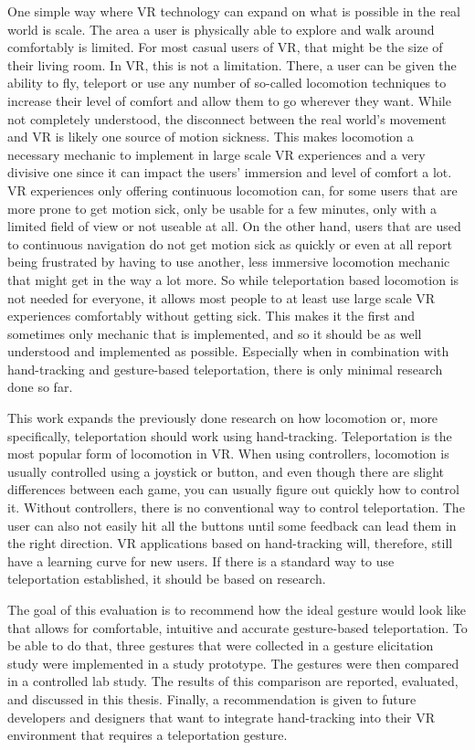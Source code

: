 One simple way where VR technology can expand on what is possible in the real world is scale. The area a user is physically able to explore and walk around comfortably is limited. For most casual users of VR, that might be the size of their living room. In VR, this is not a limitation. There, a user can be given the ability to fly, teleport or use any number of so-called locomotion techniques to increase their level of comfort and allow them to go wherever they want. While not completely understood, the disconnect between the real world's movement and VR is likely one source of motion sickness. This makes locomotion a necessary mechanic to implement in large scale VR experiences and a very divisive one since it can impact the users' immersion and level of comfort a lot. VR experiences only offering continuous locomotion can, for some users that are more prone to get motion sick, only be usable for a few minutes, only with a limited field of view or not useable at all. On the other hand, users that are used to continuous navigation do not get motion sick as quickly or even at all report being frustrated by having to use another, less immersive locomotion mechanic that might get in the way a lot more. So while teleportation based locomotion is not needed for everyone, it allows most people to at least use large scale VR experiences comfortably without getting sick. This makes it the first and sometimes only mechanic that is implemented, and so it should be as well understood and implemented as possible. Especially when in combination with hand-tracking and gesture-based teleportation, there is only minimal research done so far.

This work expands the previously done research on how locomotion or, more specifically, teleportation should work using hand-tracking. Teleportation is the most popular form of locomotion in VR. When using controllers, locomotion is usually controlled using a joystick or button, and even though there are slight differences between each game, you can usually figure out quickly how to control it. Without controllers, there is no conventional way to control teleportation. The user can also not easily hit all the buttons until some feedback can lead them in the right direction. VR applications based on hand-tracking will, therefore, still have a learning curve for new users. If there is a standard way to use teleportation established, it should be based on research. 

The goal of this evaluation is to recommend how the ideal gesture would look like that allows for comfortable, intuitive and accurate gesture-based teleportation. To be able to do that, three gestures that were collected in a gesture elicitation study \cite{elicitation} were implemented in a study prototype. The gestures were then compared in a controlled lab study. The results of this comparison are reported, evaluated, and discussed in this thesis. Finally, a recommendation is given to future developers and designers that want to integrate hand-tracking into their VR environment that requires a teleportation gesture.

